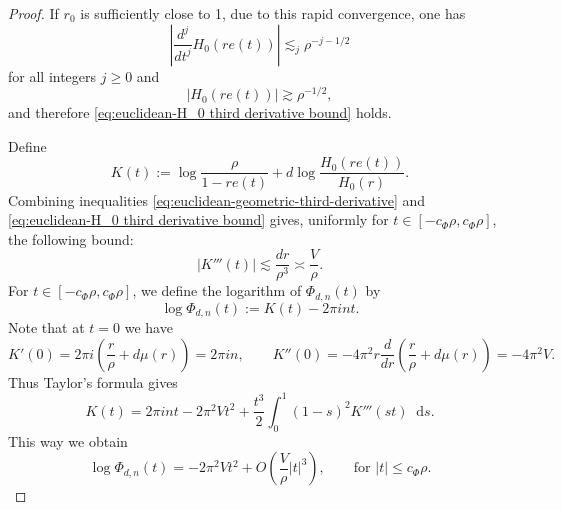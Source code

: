 \documentclass{article}
\newcommand{\dd}{\mathop{}\!\mathrm{d}}
\theoremstyle{plain}
\numberwithin{equation}{section}
\begin{document}
\begin{proof}
If $r_0$ is sufficiently close to 1, due to this rapid convergence, one has
\[
 \left|\frac{d^j}{d t ^j} H_0(re(t))\right|
 \lesssim_j \rho^{-j-1/2}
\]
for all integers $j \ge 0$
and
\[
 |H_0(re(t))| \gtrsim \rho^{-1/2},
\]
and therefore \eqref{eq:euclidean-H_0 third derivative bound} holds.

Define
\[
 K(t):=\log\frac\rho{1-re(t)}
 +d\log\frac{H_0(re(t))}{H_0(r)}.
\]
Combining inequalities
\eqref{eq:euclidean-geometric-third-derivative} and
\eqref{eq:euclidean-H_0 third derivative bound} gives, uniformly for
$t \in [-c_\Phi\rho, c_\Phi\rho]$, the following bound:
\begin{equation*}
 |K'''(t)|
 \lesssim\frac{dr}{\rho^3}\asymp\frac V\rho.
\end{equation*}
For $t \in [-c_\Phi\rho, c_\Phi\rho]$, we define
the logarithm of \(\Phi_{d,n}(t)\) by
\[
 \log\Phi_{d,n}(t):=K(t)-2\pi i nt.
\]
Note that at $t=0$ we have
\[
 K'(0)=2\pi i\left(\frac r\rho+d\mu(r)\right)=2\pi in,
 \qquad
 K''(0)=-4\pi^2r\frac d{dr}
 \left(\frac r\rho+d\mu(r)\right)=-4\pi^2V.
\]
Thus Taylor's formula gives
\[
 K(t)=2\pi i nt-2\pi^2Vt^2
 +\frac{t^3}{2}\int_0^1(1-s)^2K'''(st)\dd s.
\]
This way we obtain
\begin{equation}\label{eq:euclidean-saddle-expansion}
 \log\Phi_{d,n}(t)
 =-2\pi^2Vt^2+O\left(\frac V\rho|t|^3\right),
 \qquad \text{for } |t|\leq c_\Phi\rho.
\end{equation}


\end{proof}
\end{document}
